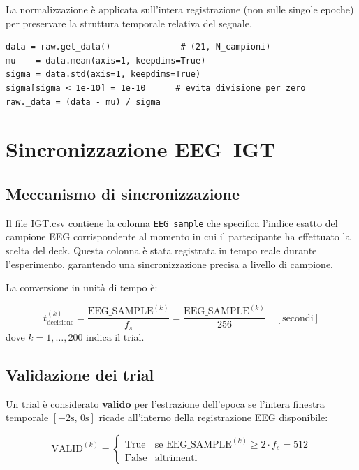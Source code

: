 \documentclass[12pt, a4paper]{article}
\begin{document}
La normalizzazione è applicata sull'intera registrazione (non sulle singole epoche) per preservare la struttura temporale relativa del segnale.

\begin{lstlisting}[caption={Normalizzazione z-score per canale}]
data = raw.get_data()              # (21, N_campioni)
mu    = data.mean(axis=1, keepdims=True)
sigma = data.std(axis=1, keepdims=True)
sigma[sigma < 1e-10] = 1e-10      # evita divisione per zero
raw._data = (data - mu) / sigma
\end{lstlisting}

\section{Sincronizzazione EEG--IGT}

\subsection{Meccanismo di sincronizzazione}

Il file IGT.csv contiene la colonna \texttt{EEG sample} che specifica l'indice esatto del campione EEG corrispondente al momento in cui il partecipante ha effettuato la scelta del deck. Questa colonna è stata registrata in tempo reale durante l'esperimento, garantendo una sincronizzazione precisa a livello di campione.

La conversione in unità di tempo è:

\begin{formulabox}
\[
t_\text{decisione}^{(k)} = \frac{\text{EEG\_SAMPLE}^{(k)}}{f_s} = \frac{\text{EEG\_SAMPLE}^{(k)}}{256}\quad[\text{secondi}]
\]
dove $k = 1,\ldots,200$ indica il trial.
\end{formulabox}

\subsection{Validazione dei trial}

Un trial è considerato \textbf{valido} per l'estrazione dell'epoca se l'intera finestra temporale $[-2\text{s},\, 0\text{s}]$ ricade all'interno della registrazione EEG disponibile:

\[
\text{VALID}^{(k)} = \begin{cases}
\text{True} & \text{se } \text{EEG\_SAMPLE}^{(k)} \geq 2 \cdot f_s = 512 \\
\text{False} & \text{altrimenti}
\end{cases}
\]
\end{document}
